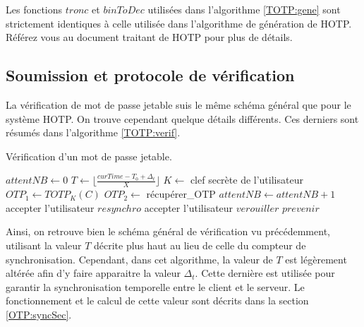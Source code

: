 \documentclass{../res/univ-projet}
\begin{document}
    Les fonctions $tronc$ et $binToDec$ utilisées dans l'algorithme \ref{TOTP:gene} sont strictement identiques à celle utilisée dans l'algorithme de génération de 
    \og{}HOTP\fg{}. Référez vous au document traitant de \og{}HOTP\fg{} pour plus de détails.
    
  \subsection{Soumission et protocole de vérification}
    La vérification de mot de passe jetable suis le même schéma général que pour le système \og{}HOTP\fg{}. On trouve cependant quelque détails différents. Ces derniers 
    sont résumés dans l'algorithme \ref{TOTP:verif}.
    \begin{algorithm}
      \caption{Vérification d'un mot de passe jetable.}
      \label{TOTP:verif}
      
      \begin{algorithmic}
	\STATE $attentNB \leftarrow 0$
	\STATE $T \leftarrow \lfloor{}\frac{curTime - T_0 + \Delta_t}{X}\rfloor{}$
	\STATE $K \leftarrow$ clef secrète de l'utilisateur
	\STATE $OTP_1 \leftarrow TOTP_K(C)$
	  \STATE $OTP_2 \leftarrow$ récupérer\_OTP
	  \STATE $attentNB \leftarrow attentNB + 1$
	    \STATE accepter l'utilisateur
	  \ELSE
	      \STATE $resynchro$
	      \STATE accepter l'utilisateur
	    \ENDIF
	  \ENDIF
	\ENDWHILE
	\STATE $verouiller$
	\STATE $prevenir$
      \end{algorithmic}
    \end{algorithm}
    Ainsi, on retrouve bien le schéma général de vérification vu précédemment, utilisant la valeur $T$ décrite plus haut au lieu de celle du compteur de synchronisation.
    Cependant, dans cet algorithme, la valeur de $T$ est légèrement altérée afin d'y faire apparaitre la valeur $\Delta_t$. Cette dernière est utilisée pour garantir la 
    synchronisation temporelle entre le client et le serveur. Le fonctionnement et le calcul de cette valeur sont décrits dans la section \ref{OTP:syncSec}.
    
\end{document}
